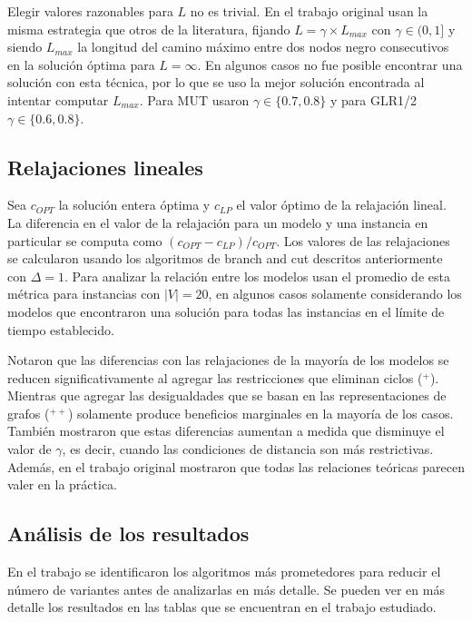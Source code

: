 \documentclass[10pt, a4paper]{article}
\theoremstyle{definition}
\begin{document}
Elegir valores razonables para $L$ no es trivial. En el trabajo original usan la misma estrategia que otros de la literatura, fijando $L = \gamma \times L_{max}$ con $\gamma \in (0,1]$ y siendo $L_{max}$ la longitud del camino máximo entre dos nodos negro consecutivos en la solución óptima para $L = \infty$. En algunos casos no fue posible encontrar una solución con esta técnica, por lo que se uso la mejor solución encontrada al intentar computar $L_{max}$. Para MUT usaron $\gamma \in \{0{.}7, 0{.}8\}$ y para GLR1/2 $\gamma \in \{0{.}6, 0{.}8\}$.

\subsection{Relajaciones lineales}

Sea $c_{OPT}$ la solución entera óptima y $c_{LP}$ el valor óptimo de la relajación lineal. La diferencia en el valor de la relajación para un modelo y una instancia en particular se computa como $(c_{OPT} - c_{LP})/c_{OPT}$. Los valores de las relajaciones se calcularon usando los algoritmos de branch and cut descritos anteriormente con $\Delta = 1$. Para analizar la relación entre los modelos usan el promedio de esta métrica para instancias con $|V| = 20$, en algunos casos solamente considerando los modelos que encontraron una solución para todas las instancias en el límite de tiempo establecido.

Notaron que las diferencias con las relajaciones de la mayoría de los modelos se reducen significativamente al agregar las restricciones que eliminan ciclos ($^{+}$). Mientras que agregar las desigualdades que se basan en las representaciones de grafos ($^{++}$) solamente produce beneficios marginales en la mayoría de los casos. También mostraron que estas diferencias aumentan a medida que disminuye el valor de $\gamma$, es decir, cuando las condiciones de distancia son más restrictivas. Además, en el trabajo original mostraron que todas las relaciones teóricas parecen valer en la práctica.


\subsection{Análisis de los resultados}

En el trabajo se identificaron los algoritmos más prometedores para reducir el número de variantes antes de analizarlas en más detalle. Se pueden ver en más detalle los resultados en las tablas que se encuentran en el trabajo estudiado.
\end{document}
